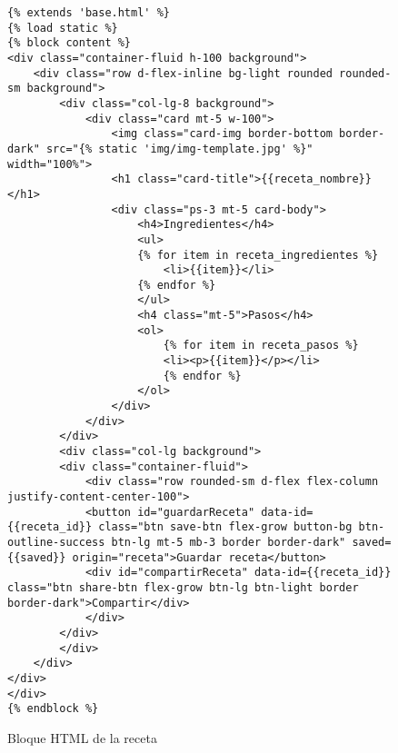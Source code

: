 \begin{figure}[H]
\begin{lstlisting}[style=consola]
{% extends 'base.html' %}
{% load static %}
{% block content %}
<div class="container-fluid h-100 background">
    <div class="row d-flex-inline bg-light rounded rounded-sm background">
        <div class="col-lg-8 background">
            <div class="card mt-5 w-100">
                <img class="card-img border-bottom border-dark" src="{% static 'img/img-template.jpg' %}" width="100%">
                <h1 class="card-title">{{receta_nombre}}</h1>
                <div class="ps-3 mt-5 card-body">
                    <h4>Ingredientes</h4>
                    <ul>
                    {% for item in receta_ingredientes %}
                        <li>{{item}}</li>
                    {% endfor %}
                    </ul>
                    <h4 class="mt-5">Pasos</h4>
                    <ol>
                        {% for item in receta_pasos %}
                        <li><p>{{item}}</p></li>
                        {% endfor %}
                    </ol>
                </div>
            </div>
        </div>
        <div class="col-lg background">
        <div class="container-fluid">
            <div class="row rounded-sm d-flex flex-column justify-content-center-100">
            <button id="guardarReceta" data-id={{receta_id}} class="btn save-btn flex-grow button-bg btn-outline-success btn-lg mt-5 mb-3 border border-dark" saved={{saved}} origin="receta">Guardar receta</button>
            <div id="compartirReceta" data-id={{receta_id}} class="btn share-btn flex-grow btn-lg btn-light border border-dark">Compartir</div>
            </div>
        </div>
        </div>
    </div>
</div>
</div>
{% endblock %}
\end{lstlisting}
\caption{Bloque HTML de la receta}
\label{sni:receta}
\end{figure}

